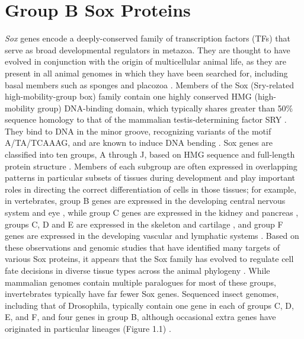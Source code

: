 \section{Group B Sox Proteins}
\emph{Sox} genes encode a deeply-conserved family of transcription factors (TFs) that serve as broad developmental regulators in metazoa. They are thought to have evolved in conjunction with the origin of multicellular animal life, as they are present in all animal genomes in which they have been searched for, including basal members such as sponges and placozoa \citep{jager_expansion_2006,jager_insights_2008,larroux_developmental_2006,phochanukul_no_2010,srivastava_trichoplax_2008}. Members of the Sox (Sry-related high-mobility-group box) family contain one highly conserved HMG (high-mobility group) DNA-binding domain, which typically shares greater than 50\% sequence homology to that of the mammalian testis-determining factor SRY \citep{bowles_phylogeny_2000,guth_having_2008,phochanukul_no_2010,sinclair_gene_1990}. They bind to DNA in the minor groove, recognizing variants of the motif A/TA/TCAAAG, and are known to induce DNA bending \citep{bowles_phylogeny_2000,ferrari_sry_1992,giese_hmg_1992}. Sox genes are classified into ten groups, A through J, based on HMG sequence and full-length protein structure \citep{schepers_twenty_2002}. Members of each subgroup are often expressed in overlapping patterns in particular subsets of tissues during development and play important roles in directing the correct differentiation of cells in those tissues; for example, in vertebrates, group B genes are expressed in the developing central nervous system and eye \citep{bergsland_sequentially_2011,kamachi_involvement_1998,uwanogho_embryonic_1995,wood_comparative_1999}, while group C genes are expressed in the kidney and pancreas \citep{huang_transcription_2013,sock_gene_2004,wilson_hmg_2005}, groups C, D and E are expressed in the skeleton and cartilage \citep{akiyama_transcription_2002,smits_transcription_????}, and group F genes are expressed in the developing vascular and lymphatic systems \citep{downes_sox18_????,matsui_redundant_2006}. Based on these observations and genomic studies that have identified many targets of various Sox proteins, it appears that the Sox family has evolved to regulate cell fate decisions in diverse tissue types across the animal phylogeny \citep{lefebvre_control_2007,whyte_master_2013}. While mammalian genomes contain multiple paralogues for most of these groups, invertebrates typically have far fewer Sox genes. Sequenced insect genomes, including that of Drosophila, typically contain one gene in each of groups C, D, E, and F, and four genes in group B, although occasional extra genes have originated in particular lineages (Figure 1.1) \citep{bowles_phylogeny_2000,phochanukul_no_2010}.\\

